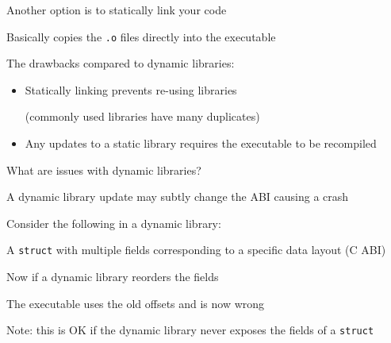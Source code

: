   \begin{slide}

    Another option is to statically link your code

    \leftspace{}Basically copies the \texttt{.o} files directly into the
    executable
    \bigskip

    The drawbacks compared to dynamic libraries:
    \begin{itemize}
      \item Statically linking prevents re-using libraries
      
            (commonly used libraries have many duplicates)
      \item Any updates to a static library requires the executable to be
            recompiled
    \end{itemize}
    \bigskip

    What are issues with dynamic libraries?
  \end{slide}

  \begin{slide}

    A dynamic library update may subtly change the ABI causing a crash
    \medskip

    Consider the following in a dynamic library:

    \leftspace{}A \texttt{struct} with multiple fields corresponding to
    a specific data layout (C ABI)
    \medskip

    \bigskip

    Now if a dynamic library reorders the fields

    \leftspace{} The executable uses the old offsets and is now wrong
    \medskip

    Note: this is OK if the dynamic library never exposes the fields of a
    \texttt{struct}
  \end{slide}

